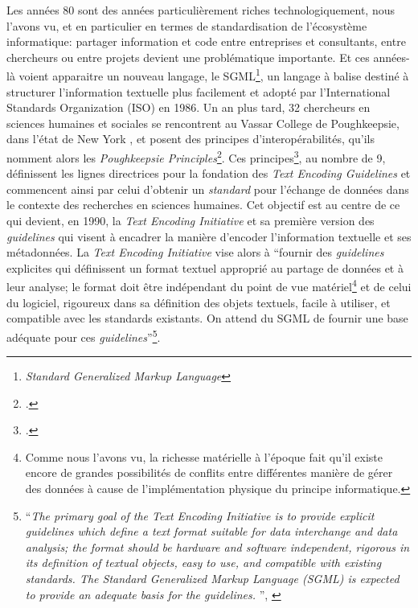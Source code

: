 Les années 80 sont des années particulièrement riches technologiquement, nous l'avons vu, et en particulier en termes de standardisation de l'écosystème informatique: partager information et code entre entreprises et consultants, entre chercheurs ou entre projets devient une problématique importante. Et ces années-là voient apparaitre un nouveau langage, le SGML\footnote{\textit{Standard Generalized Markup Language}}, un langage à balise destiné à structurer l'information textuelle plus facilement et adopté par l'International Standards Organization (ISO) en 1986. Un an plus tard, 32 chercheurs en sciences humaines et sociales se rencontrent au Vassar College de Poughkeepsie, dans l'état de New York , et posent des principes d'interopérabilités, qu'ils nomment alors les \textit{Poughkeepsie Principles}\footcite{vanhoutte_introduction_2004}. Ces principes\footcite{noauthor_design_1988}, au nombre de 9, définissent les lignes directrices pour la fondation des \textit{Text Encoding Guidelines} et commencent ainsi par celui d'obtenir un \textit{standard} pour l'échange de données dans le contexte des recherches en sciences humaines. Cet objectif est au centre de ce qui devient, en 1990, la \textit{Text Encoding Initiative} et sa première version des \textit{guidelines} qui visent à encadrer la manière d'encoder l'information textuelle et ses métadonnées. La \textit{Text Encoding Initiative} vise alors à \enquote{fournir des \textit{guidelines} explicites qui définissent un format textuel approprié au partage de données et à leur analyse; le format doit être indépendant du point de vue matériel\footnote{Comme nous l'avons vu, la richesse matérielle à l'époque fait qu'il existe encore de grandes possibilités de conflits entre différentes manière de gérer des données à cause de l'implémentation physique du principe informatique.} et de celui du logiciel, rigoureux dans sa définition des objets textuels, facile à utiliser, et compatible avec les standards existants. On attend du SGML de fournir une base adéquate pour ces \textit{guidelines}}\footnote{\enquote{\textit{The primary goal of the Text Encoding Initiative is to provide explicit guidelines which define a text format suitable for data interchange and data analysis; the format should be hardware and software independent, rigorous in its definition of textual objects, easy to use, and compatible with existing standards. The Standard Generalized Markup Language (SGML) is expected to provide an adequate basis for the guidelines. }}, \cite{noauthor_design_1988}}.

